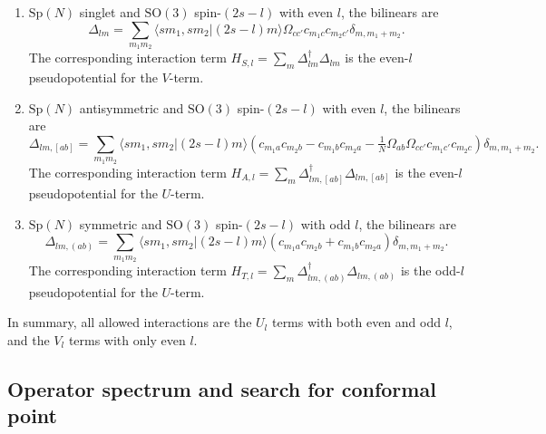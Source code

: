 \documentclass{timesjhep}
\begin{document}
\begin{enumerate}
    \item $\mathrm{Sp}(N)$ singlet and $\mathrm{SO}(3)$ spin-$(2s-l)$ with even $l$, the bilinears are
    \begin{equation}
        \Delta_{lm}=\sum_{m_1m_2}\langle sm_1,sm_2|(2s-l)m\rangle\Omega_{cc'}c_{m_1c}c_{m_2c'}\delta_{m,m_1+m_2}.
    \end{equation}
    The corresponding interaction term $H_{S,l}=\sum_m\Delta_{lm}^\dagger\Delta_{lm}$ is the even-$l$ pseudopotential for the $V$-term.
    \item $\mathrm{Sp}(N)$ antisymmetric and $\mathrm{SO}(3)$ spin-$(2s-l)$ with even $l$, the bilinears are
    \begin{equation}
        \Delta_{lm,[ab]}=\sum_{m_1m_2}\langle sm_1,sm_2|(2s-l)m\rangle(c_{m_1a}c_{m_2b}-c_{m_1b}c_{m_2a}-\tfrac{1}{N}\Omega_{ab}\Omega_{cc'}c_{m_1c'}c_{m_2c})\delta_{m,m_1+m_2}.
    \end{equation}
    The corresponding interaction term $H_{A,l}=\sum_m\Delta_{lm,[ab]}^\dagger\Delta_{lm,[ab]}$ is the even-$l$ pseudopotential for the $U$-term.
    \item $\mathrm{Sp}(N)$ symmetric and $\mathrm{SO}(3)$ spin-$(2s-l)$ with odd $l$, the bilinears are
    \begin{equation}
        \Delta_{lm,(ab)}=\sum_{m_1m_2}\langle sm_1,sm_2|(2s-l)m\rangle(c_{m_1a}c_{m_2b}+c_{m_1b}c_{m_2a})\delta_{m,m_1+m_2}.
    \end{equation}
    The corresponding interaction term $H_{T,l}=\sum_m\Delta_{lm,(ab)}^\dagger\Delta_{lm,(ab)}$ is the odd-$l$ pseudopotential for the $U$-term.
\end{enumerate}

In summary, all allowed interactions are the $U_l$ terms with both even and odd $l$, and the $V_l$ terms with only even $l$.

\subsection{Operator spectrum and search for conformal point}
\label{sec:construct_spec}
\end{document}
